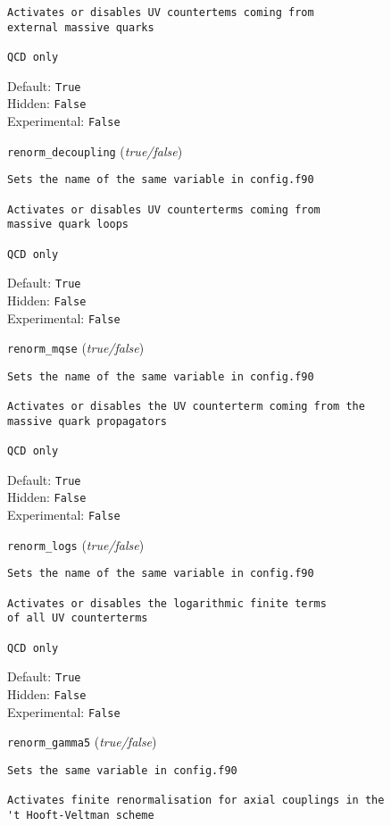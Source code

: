 \begin{basedescript}{\desclabelstyle{\pushlabel}}
\begin{verbatim}
Activates or disables UV countertems coming from
external massive quarks

QCD only
\end{verbatim}
Default: \verb|True|
\\Hidden: \verb|False|
\\Experimental: \verb|False|
\\\item[\colorbox{gray!30}{\texttt{renorm\_decoupling}}] (\textit{true/false})
\begin{verbatim}
Sets the name of the same variable in config.f90

Activates or disables UV counterterms coming from
massive quark loops

QCD only
\end{verbatim}
Default: \verb|True|
\\Hidden: \verb|False|
\\Experimental: \verb|False|
\\\item[\colorbox{gray!30}{\texttt{renorm\_mqse}}] (\textit{true/false})
\begin{verbatim}
Sets the name of the same variable in config.f90

Activates or disables the UV counterterm coming from the
massive quark propagators

QCD only
\end{verbatim}
Default: \verb|True|
\\Hidden: \verb|False|
\\Experimental: \verb|False|
\\\item[\colorbox{gray!30}{\texttt{renorm\_logs}}] (\textit{true/false})
\begin{verbatim}
Sets the name of the same variable in config.f90

Activates or disables the logarithmic finite terms
of all UV counterterms

QCD only
\end{verbatim}
Default: \verb|True|
\\Hidden: \verb|False|
\\Experimental: \verb|False|
\\\item[\colorbox{gray!30}{\texttt{renorm\_gamma5}}] (\textit{true/false})
\begin{verbatim}
Sets the same variable in config.f90

Activates finite renormalisation for axial couplings in the
't Hooft-Veltman scheme


\end{verbatim}
\end{basedescript}
